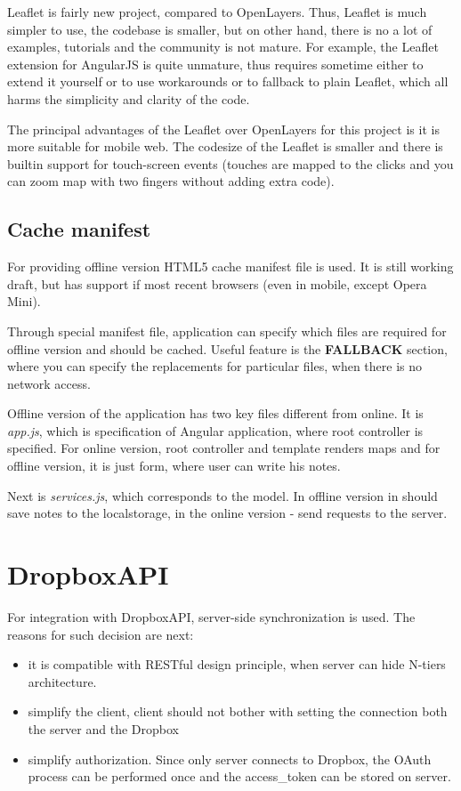 \documentclass[12pt,a4paper]{article}
\begin{document}
Leaflet is fairly new project, compared to OpenLayers. Thus, Leaflet is much simpler to use,
the codebase is smaller, but on other hand, there is no a lot of examples, tutorials and
the community is not mature. For example, the Leaflet extension for AngularJS is quite
unmature, thus requires sometime either to extend it yourself or to use workarounds
or to fallback to plain Leaflet, which all harms the simplicity and clarity of the code.

The principal advantages of the Leaflet over OpenLayers for this project is
it is more suitable for mobile web. The codesize of the Leaflet is smaller
and there is builtin support for touch-screen events (touches are mapped to
the clicks and you can zoom map with two fingers without adding extra code).

\subsection{Cache manifest}
For providing offline version HTML5 cache manifest file is used. It is still working
draft, but has support if most recent browsers (even in mobile, except Opera Mini).

Through special manifest file, application can specify which files are required for
offline version and should be cached. Useful feature is the \textbf{FALLBACK} section,
where you can specify the replacements for particular files, when there is no network
access.

Offline version of the application has two key files different from online.
It is \textit{app.js}, which is specification of Angular application, where root
controller is specified. For online version, root controller and template renders maps
and for offline version, it is just form, where user can write his notes.

Next is \textit{services.js}, which corresponds to the model. In offline version
in should save notes to the localstorage, in the online version - send requests
to the server.

\section{DropboxAPI}
For integration with DropboxAPI, server-side synchronization is used. The reasons
for such decision are next:

\begin{itemize}
    \item it is compatible with RESTful design principle, when server can hide N-tiers architecture.
    \item simplify the client, client should not bother with setting the connection both the
server and the Dropbox
    \item simplify authorization. Since only server connects to Dropbox, the OAuth process can
be performed once and the access\_token can be stored on server.
\end{itemize}
\end{document}
